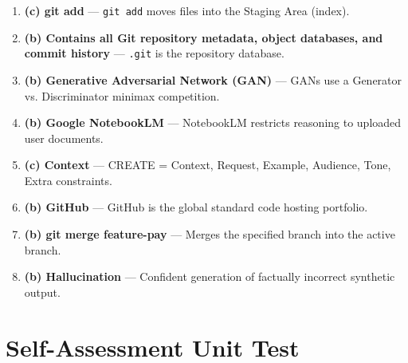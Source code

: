\begin{solutionbox}
\begin{enumerate}
    \item \textbf{(c) git add} --- \texttt{git add} moves files into the Staging Area (index).
    \item \textbf{(b) Contains all Git repository metadata, object databases, and commit history} --- \texttt{.git} is the repository database.
    \item \textbf{(b) Generative Adversarial Network (GAN)} --- GANs use a Generator vs. Discriminator minimax competition.
    \item \textbf{(b) Google NotebookLM} --- NotebookLM restricts reasoning to uploaded user documents.
    \item \textbf{(c) Context} --- CREATE = Context, Request, Example, Audience, Tone, Extra constraints.
    \item \textbf{(b) GitHub} --- GitHub is the global standard code hosting portfolio.
    \item \textbf{(b) git merge feature-pay} --- Merges the specified branch into the active branch.
    \item \textbf{(b) Hallucination} --- Confident generation of factually incorrect synthetic output.
\end{enumerate}
\end{solutionbox}

\section{Self-Assessment Unit Test}

